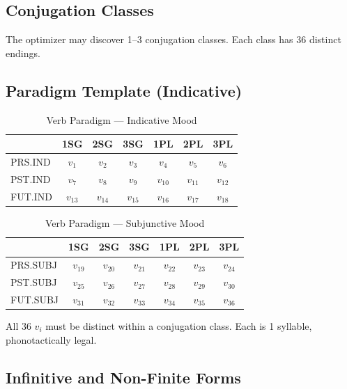 \documentclass[12pt]{book}
\begin{document}
\subsection{Conjugation Classes}

The optimizer may discover 1--3 conjugation classes.
Each class has 36 distinct endings.

\subsection{Paradigm Template (Indicative)}

\begin{table}[h]
\centering
\caption{Verb Paradigm --- Indicative Mood}
\label{tab:verb-ind}
\begin{tabular}{@{}lcccccc@{}}
\toprule
         & 1SG & 2SG & 3SG & 1PL & 2PL & 3PL \\
\midrule
PRS.IND  & $v_1$ & $v_2$ & $v_3$ & $v_4$ & $v_5$ & $v_6$ \\
PST.IND  & $v_7$ & $v_8$ & $v_9$ & $v_{10}$ & $v_{11}$ & $v_{12}$ \\
FUT.IND  & $v_{13}$ & $v_{14}$ & $v_{15}$ & $v_{16}$ & $v_{17}$ & $v_{18}$ \\
\bottomrule
\end{tabular}
\end{table}

\begin{table}[h]
\centering
\caption{Verb Paradigm --- Subjunctive Mood}
\label{tab:verb-subj}
\begin{tabular}{@{}lcccccc@{}}
\toprule
         & 1SG & 2SG & 3SG & 1PL & 2PL & 3PL \\
\midrule
PRS.SUBJ  & $v_{19}$ & $v_{20}$ & $v_{21}$ & $v_{22}$ & $v_{23}$ & $v_{24}$ \\
PST.SUBJ  & $v_{25}$ & $v_{26}$ & $v_{27}$ & $v_{28}$ & $v_{29}$ & $v_{30}$ \\
FUT.SUBJ  & $v_{31}$ & $v_{32}$ & $v_{33}$ & $v_{34}$ & $v_{35}$ & $v_{36}$ \\
\bottomrule
\end{tabular}
\end{table}

\noindent All 36 $v_i$ must be distinct within a conjugation class.
Each is 1 syllable, phonotactically legal.

\subsection{Infinitive and Non-Finite Forms}
\end{document}
